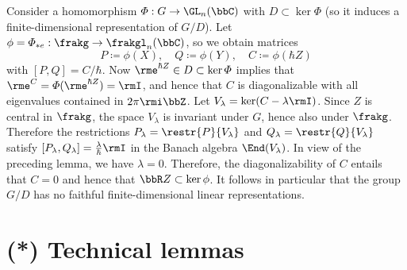\begin{example}
    Consider a homomorphism $\varPhi:G\to\GL_n(\bbC)$ with $D\subset \ker\varPhi$ (so it induces a finite-dimensional representation of $G\slash D$). Let $\phi=\varPhi_{\ast e}:\frakg\to \frakgl_n(\bbC)$, so we obtain matrices
    \[P\coloneqq \phi(X), \quad Q\coloneqq \phi(Y),\quad C\coloneqq \phi(\hbar Z)\]
    with $[P,Q]=C/\hbar$. Now $\rme^{\hbar Z}\in D\subset\ker\varPhi$ implies that $\rme^{C}=\varPhi(\rme^{\hbar Z})=\rmI$, and hence that $C$ is diagonalizable with all eigenvalues contained in $2\pi\rmi\bbZ$. Let $V_\lambda=\ker (C-\lambda \rmI)$. Since $Z$ is central in $\frakg$, the space $V_\lambda$ is invariant under $G$, hence also under $\frakg$. Therefore the restrictions $P_\lambda=\restr{P}{V_\lambda}$ and $Q_\lambda=\restr{Q}{V_\lambda}$ satisfy $[P_\lambda,Q_\lambda]=\frac{\lambda}{\hbar} \rmI$ in the Banach algebra $\End(V_\lambda)$. In view of the preceding lemma, we have $\lambda=0$. Therefore, the diagonalizability of $C$ entails that $C=0$ and hence that $\bbR Z\subset \ker\phi$. It follows in particular that the group $G\slash D$ has no faithful finite-dimensional linear representations.
\end{example}









\section{(*) Technical lemmas}


